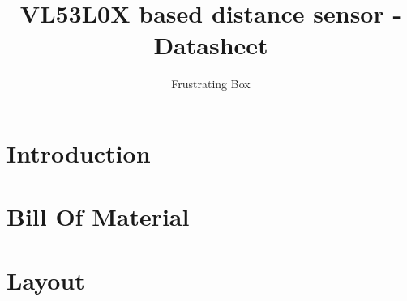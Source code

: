 \documentclass[12pt,a4paper]{article}
\author{Frustrating Box}
\title{VL53L0X based distance sensor - Datasheet}
\begin{document}
\maketitle

\section{Introduction}
	
\section{Bill Of Material}
	
\section{Layout}
	
\end{document}
